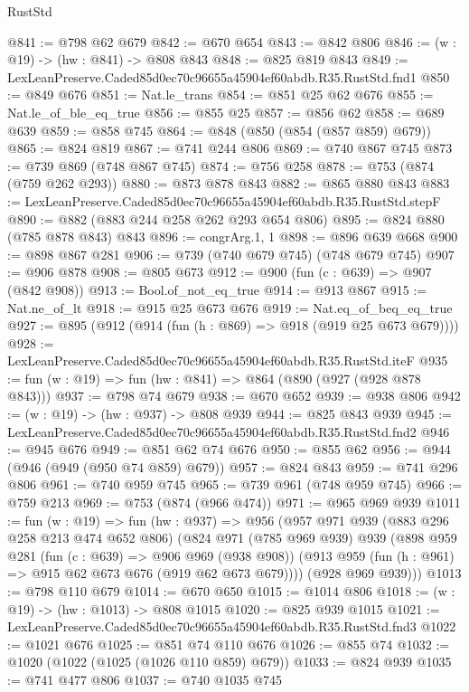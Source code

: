 \begin{lexlean}{RustStd}
\begin{coremodule}
@841 := @798 @62 @679
@842 := @670 @654
@843 := @842 @806
@846 := (w : @19) -> (hw : @841) -> @808 @843
@848 := @825 @819 @843
@849 := LexLeanPreserve.Caded85d0ec70c96655a45904ef60abdb.R35.RustStd.fnd1
@850 := @849 @676
@851 := Nat.le_trans
@854 := @851 @25 @62 @676
@855 := Nat.le_of_ble_eq_true
@856 := @855 @25
@857 := @856 @62
@858 := @689 @639
@859 := @858 @745
@864 := @848 (@850 (@854 (@857 @859) @679))
@865 := @824 @819
@867 := @741 @244 @806
@869 := @740 @867 @745
@873 := @739 @869 (@748 @867 @745)
@874 := @756 @258
@878 := @753 (@874 (@759 @262 @293))
@880 := @873 @878 @843
@882 := @865 @880 @843
@883 := LexLeanPreserve.Caded85d0ec70c96655a45904ef60abdb.R35.RustStd.stepF
@890 := @882 (@883 @244 @258 @262 @293 @654 @806)
@895 := @824 @880 (@785 @878 @843) @843
@896 := congrArg.{1, 1}
@898 := @896 @639 @668
@900 := @898 @867 @281
@906 := @739 (@740 @679 @745) (@748 @679 @745)
@907 := @906 @878
@908 := @805 @673
@912 := @900 (fun (c : @639) => @907 (@842 @908))
@913 := Bool.of_not_eq_true
@914 := @913 @867
@915 := Nat.ne_of_lt
@918 := @915 @25 @673 @676
@919 := Nat.eq_of_beq_eq_true
@927 := @895 (@912 (@914 (fun (h : @869) => @918 (@919 @25 @673 @679))))
@928 := LexLeanPreserve.Caded85d0ec70c96655a45904ef60abdb.R35.RustStd.iteF
@935 := fun (w : @19) => fun (hw : @841) => @864 (@890 (@927 (@928 @878 @843)))
@937 := @798 @74 @679
@938 := @670 @652
@939 := @938 @806
@942 := (w : @19) -> (hw : @937) -> @808 @939
@944 := @825 @843 @939
@945 := LexLeanPreserve.Caded85d0ec70c96655a45904ef60abdb.R35.RustStd.fnd2
@946 := @945 @676
@949 := @851 @62 @74 @676
@950 := @855 @62
@956 := @944 (@946 (@949 (@950 @74 @859) @679))
@957 := @824 @843
@959 := @741 @296 @806
@961 := @740 @959 @745
@965 := @739 @961 (@748 @959 @745)
@966 := @759 @213
@969 := @753 (@874 (@966 @474))
@971 := @965 @969 @939
@1011 := fun (w : @19) =>
  fun (hw : @937) =>
  @956
    (@957
      @971
      @939
      (@883 @296 @258 @213 @474 @652 @806)
      (@824
        @971
        (@785 @969 @939)
        @939
        (@898
          @959
          @281
          (fun (c : @639) => @906 @969 (@938 @908))
          (@913 @959 (fun (h : @961) => @915 @62 @673 @676 (@919 @62 @673 @679))))
        (@928 @969 @939)))
@1013 := @798 @110 @679
@1014 := @670 @650
@1015 := @1014 @806
@1018 := (w : @19) -> (hw : @1013) -> @808 @1015
@1020 := @825 @939 @1015
@1021 := LexLeanPreserve.Caded85d0ec70c96655a45904ef60abdb.R35.RustStd.fnd3
@1022 := @1021 @676
@1025 := @851 @74 @110 @676
@1026 := @855 @74
@1032 := @1020 (@1022 (@1025 (@1026 @110 @859) @679))
@1033 := @824 @939
@1035 := @741 @477 @806
@1037 := @740 @1035 @745

\end{coremodule}
\end{lexlean}
